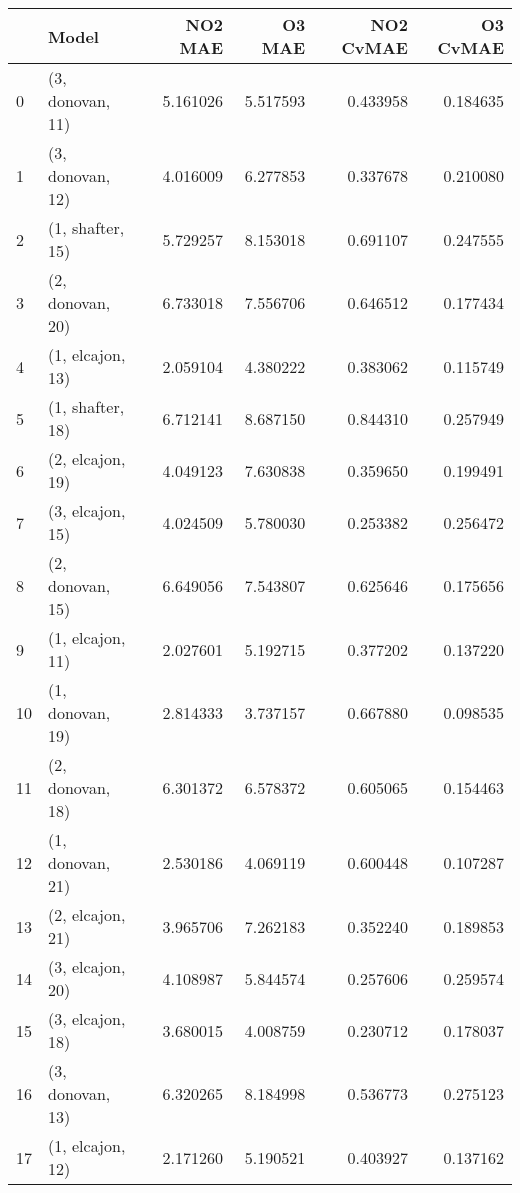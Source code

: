 \begin{tabular}{llrrrr}
\toprule
{} &             Model &   NO2 MAE &    O3 MAE &  NO2 CvMAE &  O3 CvMAE \\
\midrule
0  &  (3, donovan, 11) &  5.161026 &  5.517593 &   0.433958 &  0.184635 \\
1  &  (3, donovan, 12) &  4.016009 &  6.277853 &   0.337678 &  0.210080 \\
2  &  (1, shafter, 15) &  5.729257 &  8.153018 &   0.691107 &  0.247555 \\
3  &  (2, donovan, 20) &  6.733018 &  7.556706 &   0.646512 &  0.177434 \\
4  &  (1, elcajon, 13) &  2.059104 &  4.380222 &   0.383062 &  0.115749 \\
5  &  (1, shafter, 18) &  6.712141 &  8.687150 &   0.844310 &  0.257949 \\
6  &  (2, elcajon, 19) &  4.049123 &  7.630838 &   0.359650 &  0.199491 \\
7  &  (3, elcajon, 15) &  4.024509 &  5.780030 &   0.253382 &  0.256472 \\
8  &  (2, donovan, 15) &  6.649056 &  7.543807 &   0.625646 &  0.175656 \\
9  &  (1, elcajon, 11) &  2.027601 &  5.192715 &   0.377202 &  0.137220 \\
10 &  (1, donovan, 19) &  2.814333 &  3.737157 &   0.667880 &  0.098535 \\
11 &  (2, donovan, 18) &  6.301372 &  6.578372 &   0.605065 &  0.154463 \\
12 &  (1, donovan, 21) &  2.530186 &  4.069119 &   0.600448 &  0.107287 \\
13 &  (2, elcajon, 21) &  3.965706 &  7.262183 &   0.352240 &  0.189853 \\
14 &  (3, elcajon, 20) &  4.108987 &  5.844574 &   0.257606 &  0.259574 \\
15 &  (3, elcajon, 18) &  3.680015 &  4.008759 &   0.230712 &  0.178037 \\
16 &  (3, donovan, 13) &  6.320265 &  8.184998 &   0.536773 &  0.275123 \\
17 &  (1, elcajon, 12) &  2.171260 &  5.190521 &   0.403927 &  0.137162 \\
\bottomrule
\end{tabular}
